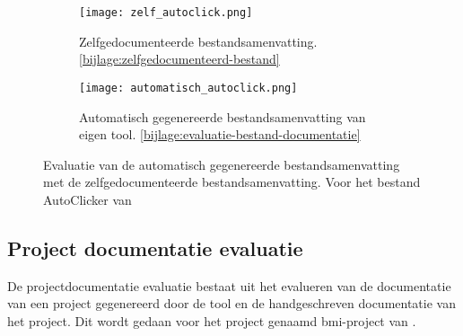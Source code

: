 \begin{figure}
    \centering
    \begin{subfigure}[b]{1\textwidth}
        \centering
        \texttt{[image: zelf\_autoclick.png]}
        \caption{Zelfgedocumenteerde bestandsamenvatting. \ref{bijlage:zelfgedocumenteerd-bestand}}
        \label{fig:zelfgedocumenteerd-bestandsamenvatting}
    \end{subfigure}
    \hfill
    \begin{subfigure}[b]{1\textwidth}
        \centering
        \texttt{[image: automatisch\_autoclick.png]}
        \caption{Automatisch gegenereerde bestandsamenvatting van eigen tool. \ref{bijlage:evaluatie-bestand-documentatie}}
        \label{fig:automatisch-bestandsamenvatting}
    \end{subfigure}
    \caption{Evaluatie van de automatisch gegenereerde bestandsamenvatting met de zelfgedocumenteerde bestandsamenvatting. Voor het bestand AutoClicker van \textcite{Waegeneer2022}}
    \label{fig:evaluatie-bestand-documentatie}
\end{figure}


\subsection{Project documentatie evaluatie}
\label{sec:project-documentatie-evaluatie-project}

De projectdocumentatie evaluatie bestaat uit het evalueren van de documentatie van een project gegenereerd door de tool en de handgeschreven documentatie van het project.
Dit wordt gedaan voor het project genaamd bmi-project van \textcite{Simmons2019}.

\begin{table}
    \caption{Evaluatie van de documentatie van het project bmi-project van \textcite{Simmons2019}}
    \label{table:projecten-evaluatie}
\end{table}

